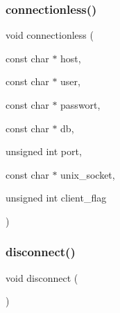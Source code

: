 \subsubsection{connectionless()}
{\footnotesize\ttfamily void connectionless (\begin{DoxyParamCaption}\item[{const char $\ast$}]{host,  }\item[{const char $\ast$}]{user,  }\item[{const char $\ast$}]{passwort,  }\item[{const char $\ast$}]{db,  }\item[{unsigned int}]{port,  }\item[{const char $\ast$}]{unix\+\_\+socket,  }\item[{unsigned int}]{client\+\_\+flag }\end{DoxyParamCaption})}

\mbox{\label{connection_8hpp_a960705de531a20389fb29928d43258c3}} 
\subsubsection{disconnect()}
{\footnotesize\ttfamily void disconnect (\begin{DoxyParamCaption}{ }\end{DoxyParamCaption})}

